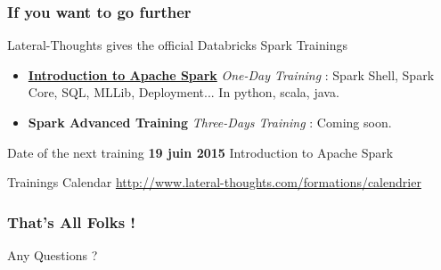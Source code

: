 \documentclass[slidetop,9pt,utf8]{beamer}
\begin{document}
\begin{frame}
  \frametitle{If you want to go further}

  \begin{block}{Lateral-Thoughts gives the official Databricks Spark Trainings}
    \begin{itemize}
      \item \textbf{\href{http://www.lateral-thoughts.com/formations/formation-spark}{Introduction to Apache Spark}} \textit{One-Day Training} : \newline Spark Shell, Spark Core, SQL, MLLib, Deployment... In python, scala, java.
      \item \textbf{Spark Advanced Training} \textit{Three-Days Training} : \newline Coming soon.
    \end{itemize}
  \end{block}

  \begin{block}{Date of the next training}
    \textbf{19 juin 2015} Introduction to Apache Spark
  \end{block}

  \begin{block}{Trainings Calendar}
    \LARGE\href{http://www.lateral-thoughts.com/formations/calendrier}{http://www.lateral-thoughts.com/formations/calendrier}\normalsize
  \end{block}

\end{frame}

\begin{frame}

  \frametitle{That's All Folks !}
  
  
  \begin{center}
    \Huge Any Questions ?\normalsize
  \end{center}
\end{frame}
\end{document}

